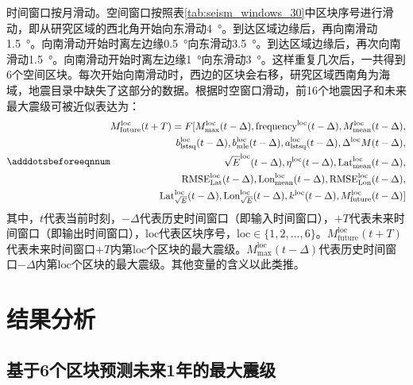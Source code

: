 时间窗口按月滑动。空间窗口按照表\ref{tab:seism_windows_30}中区块序号进行滑动，即从研究区域的西北角开始向东滑动\SI{4}{\degree}。到达区域边缘后，再向南滑动\SI{1.5}{\degree}。向南滑动开始时离左边缘\SI{0.5}{\degree}向东滑动\SI{3.5}{\degree}。到达区域边缘后，再次向南滑动\SI{1.5}{\degree}。向南滑动开始时离左边缘\SI{1}{\degree}向东滑动\SI{3}{\degree}。这样重复几次后，一共得到6个空间区块。每次开始向南滑动时，西边的区块会右移，研究区域西南角为海域，地震目录中缺失了这部分的数据。根据时空窗口滑动，前16个地震因子和未来最大震级可被近似表达为：
\begin{equation}\adddotsbeforeeqnnum
  \label{eq:seism_m_indicator}
  \begin{split}
    M_{\text{future}}^{\text{loc}}(t+T)=F[M_{\text{max}}^{\text{loc}}(t-\Delta ),\text{frequency}^{\text{loc}}(t-\Delta ),M_{\text{mean}}^{\text{loc}}(t-\Delta ),\\
    b_{\text{lstsq}}^{\text{loc}}(t-\Delta ),b_{\text{mle}}^{\text{loc}}(t-\Delta ),a_{\text{lstsq}}^{\text{loc}}(t-\Delta ),\Delta^{\text{loc}}M(t-\Delta ),\\
    \sqrt{E}^{\text{loc}}(t-\Delta ),\eta^{\text{loc}}(t-\Delta ),\text{Lat}_{\text{mean}}^{\text{loc}}(t-\Delta ),\\
    \text{RMSE}_{\text{Lat}}^{\text{loc}}(t-\Delta ),\text{Lon}_{\text{mean}}^{\text{loc}}(t-\Delta ),\text{RMSE}_{\text{Lon}}^{\text{loc}}(t-\Delta ),
    \\
    \text{Lat}^{\text{loc}}_{\sqrt{E}}(t-\Delta),\text{Lon}^{\text{loc}}_{\sqrt{E}}(t-\Delta ),k^{\text{loc}}(t-\Delta),M_{\text{future}}^{\text{loc}}(t-\Delta)]
  \end{split}
\end{equation}
其中，$t$代表当前时刻，$-\Delta $代表历史时间窗口（即输入时间窗口），$+T$代表未来时间窗口（即输出时间窗口），$\text{loc}$代表区块序号，$\text{loc}\in\{1,2,\ldots,6\}$。$M_{\text{future}}^{\text{loc}}(t+T)$代表未来时间窗口$+T$内第$\text{loc}$个区块的最大震级。$M_{\text{max}}^{\text{loc}}(t- \Delta )$代表历史时间窗口$- \Delta $内第$\text{loc}$个区块的最大震级。其他变量的含义以此类推。

\section{结果分析}\label{sec:seism_result}

\subsection{基于6个区块预测未来1年的最大震级}\label{sec:seism_result_6}

